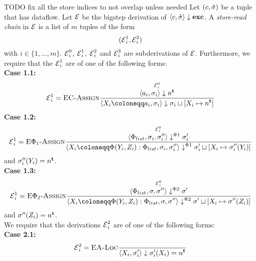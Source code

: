 \begin{definition}
    {\color{red}TODO fix all the store indices to not overlap unless needed}
    Let $(c, \tilde{\sigma}{})$ be a tuple that has dataflow.
    Let $\operatorname{\mathcal{E}}$ be the bigstep derivation of
    $\langle c, \tilde{\sigma}{} \rangle \downarrow \textbf{exc}$.
    A \emph{store-read chain} in $\operatorname{\mathcal{E}}$ is a list of $m$ tuples of the form
    \begin{equation*}
        (\operatorname{\mathcal{E}}^1_i, \operatorname{\mathcal{E}}^2_i)
    \end{equation*}
    with $i \in \{1, \ldots, m\}$.
    $\operatorname{\mathcal{E}}^0_i$, $\operatorname{\mathcal{E}}^1_i$, $\operatorname{\mathcal{E}}^2_i$ and $\operatorname{\mathcal{E}}^3_i$ are subderivations of $\operatorname{\mathcal{E}}$.
    Furthermore, we require that the $\operatorname{\mathcal{E}}^1_i$ are of one of the following forms:\\
    \textbf{Case 1.1:}\\
    \begin{align*}
        \E^1_i=\bsrule{EC-Assign}
        {\bigstepderiv{\E^0_i}{a_i}{\sigma_i}{\tracked{}}}
        {\bigstep{\storecmd{X_i}{a_i}}{\store_i}
        {\store_i \dunion [X_i \mapsto \tracked{}]}}
    \end{align*}
    \textbf{Case 1.2:}\\
    \begin{align*}
        \E^1_i=\bsrule{E$\Phi_1$-Assign}
        {\overset{\E^0_i}{\bigsteppl{\defaultphilist}{\store_i}{\store_i''}{\store_i'}}}
        {\bigsteppl{\phistore{X_i}{Y_i}{Z_i} : \defaultphilist}{\store_i}{\store_i''}{\storeassign{\store_i'}{X_i \mapsto \store_i''(Y_i)}}}\\
    \end{align*} and $\sigma_i''(Y_i) = n^\textbf{t}{}$.\\
     \textbf{Case 1.3:}\\
     \begin{align*}
        \E^1_i=\bsrule{E$\Phi_2$-Assign}
        {\overset{\E^0_i}{\bigsteppr{\defaultphilist}{\store}{\store''}{\store'}}}
        {\bigsteppr{\phistore{X_i}{Y_i}{Z_i} : \defaultphilist}{\store}{\store''}{\storeassign{\store'}{X_i \mapsto \store''(Z_i)}}}\\
    \end{align*} and $\sigma''(Z_i) = n^\textbf{t}{}$.\\
    We require that the derivations $\operatorname{\mathcal{E}}^2_i$ are of one of the following forms:\\
    \textbf{Case 2.1:}\\
    \begin{align*}
        \E^2_i=\bsrule{EA-Loc}{}
        {\bigstep{X_i}{\store_i'}{\store_i'(X_i) = \tracked{}}}

\end{align*}
\end{definition}
